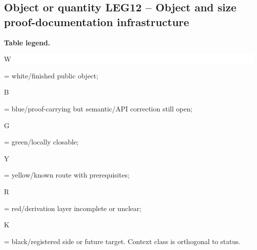 \subsection*{Object or quantity LEG12 -- Object and size proof-documentation infrastructure}
\hypertarget{objproof:LEG12}{}
\par\smallskip\noindent\begin{minipage}{0.99\linewidth}\footnotesize\raggedright\textbf{Table legend.} \colorbox{white}{\strut W} = white/finished public object; \colorbox{cyan!20}{\strut B} = blue/proof-carrying but semantic/API correction still open; \colorbox{green!18}{\strut G} = green/locally closable; \colorbox{yellow!25}{\strut Y} = yellow/known route with prerequisites; \colorbox{red!20}{\strut R} = red/derivation layer incomplete or unclear; \colorbox{black!18}{\strut K} = black/registered side or future target. Context class is orthogonal to status.\end{minipage}\par\vspace{0.25em}

